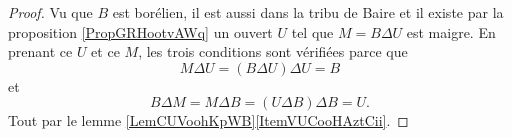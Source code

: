 \begin{proof}
    Vu que \( B\) est borélien, il est aussi dans la tribu de Baire et il existe par la proposition \ref{PropGRHootvAWq} un ouvert \( U\) tel que \( M=B\Delta U\) est maigre. En prenant ce \( U\) et ce \( M\), les trois conditions sont vérifiées parce que
    \begin{equation}
        M\Delta U=(B\Delta U)\Delta U=B
    \end{equation}
    et
    \begin{equation}
        B\Delta M=M\Delta B=(U\Delta B)\Delta B=U.
    \end{equation}
    Tout par le lemme \ref{LemCUVoohKpWB}\ref{ItemVUCooHAztCii}.
\end{proof}
